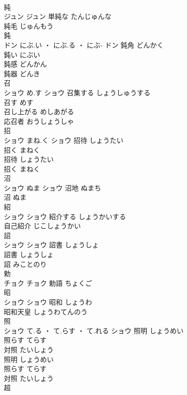 \documentclass[8pt]{extreport}
\begin{document}
\begin{CJK}{UTF8}{min}
\\	純	
\\	ジュン		ジュン	単純な	たんじゅんな	
\\	純毛	じゅんもう	
\\	鈍	
\\	ドン	にぶ.い ・ にぶ.る ・ にぶ-	ドン	鈍角	どんかく	
\\	鈍い	にぶい	
\\	鈍感	どんかん	
\\	鈍器	どんき	
\\	召	
\\	ショウ	め.す	ショウ	召集する	しょうしゅうする	
\\	召す	めす	
\\	召し上がる	めしあがる	
\\	応召者	おうしょうしゃ	
\\	招	
\\	ショウ	まね.く	ショウ	招待	しょうたい	
\\	招く	まねく	
\\	招待	しょうたい	
\\	招く	まねく	
\\	沼	
\\	ショウ	ぬま	ショウ	沼地	ぬまち	
\\	沼	ぬま	
\\	紹	
\\	ショウ		ショウ	紹介する	しょうかいする	
\\	自己紹介	じこしょうかい	
\\	詔	
\\	ショウ		ショウ	詔書	しょうしょ	
\\	詔書	しょうしょ	
\\	詔	みことのり	
\\	勅	
\\	チョク		チョク													勅語	ちょくご	
\\	昭	
\\	ショウ		ショウ	昭和	しょうわ	
\\	昭和天皇	しょうわてんのう	
\\	照	
\\	ショウ	て.る ・ て.らす ・ て.れる	ショウ	照明	しょうめい	
\\	照らす	てらす	
\\	対照	たいしょう	
\\	照明	しょうめい	
\\	照らす	てらす	
\\	対照	たいしょう	
\\	超	

\end{CJK}
\end{document}
